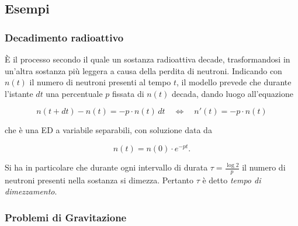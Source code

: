 \documentclass[a4paper,twoside]{article}
\theoremstyle{definition}
\numberwithin{theorem}{section}
\begin{document}
\subsection{Esempi}
\subsubsection{Decadimento radioattivo}
È il processo secondo il quale un sostanza radioattiva decade, trasformandosi in un'altra sostanza più leggera a causa della perdita di neutroni. Indicando con $n(t)$ il numero di neutroni presenti al tempo $t$, il modello prevede che durante l'istante $dt$ una percentuale $p$ fissata di $n(t)$ decada, dando luogo all'equazione

$$ n(t+dt)-n(t) = -p\cdot n(t)\, dt\quad\Leftrightarrow\quad n'(t) = -p\cdot n(t) $$ 

che è una ED a variabile separabili, con soluzione data da 

$$ n(t) = n(0)\cdot e^{-pt}. $$

Si ha in particolare che durante ogni intervallo di durata $\tau=\frac{\log 2}{p}$ il numero di neutroni presenti nella sostanza si dimezza. Pertanto $\tau$ è detto \emph{tempo di dimezzamento}.

\subsubsection{Problemi di Gravitazione}
\end{document}
